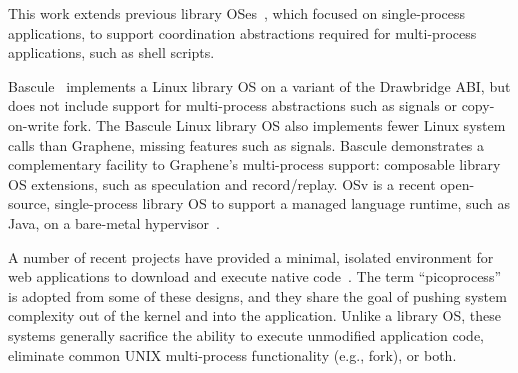 \begin{comment}
Recent library OSes, including Graphene,
search for a better
division of labor between the host kernel and guests.
Paravirtualized VMs attempt to move away from modeling specific hardware designs in software
toward a more virtualization-friendly hardware model~\citep{barham03xen,whitaker02denali, eiraku09outsourcing}.
Library OSes can be viewed as extreme paravirtualization---attempting
to find the most ideal interface between guest and host. %
\end{comment}


This work extends previous library OSes~\citep{porter11drawbridge,xax,unikernels,baumann13bascule,osv},
which focused on single-process applications,
to support coordination abstractions required 
for multi-process applications, such as shell scripts.


Bascule~\citep{baumann13bascule} implements a Linux library OS on a variant of the Drawbridge ABI,
but does not include support for multi-process abstractions such as signals or copy-on-write fork.
The Bascule Linux library OS also implements fewer Linux system calls than Graphene, missing
features such as signals.
Bascule demonstrates a complementary facility to Graphene's multi-process support: composable library OS extensions, 
such as speculation and record/replay.
OSv is a recent open-source, %
single-process 
library OS to support a managed language runtime, such as Java, on a bare-metal hypervisor~\citep{osv}.


A number of recent projects have provided a minimal, isolated environment
for web applications to download and execute native code~\citep{nacl,xax,howell13refactoring,gazelle,atlantis}.
The term ``picoprocess'' is adopted from some of these designs, and they share 
the goal of pushing system complexity out of the kernel and into the application.
Unlike a library OS, these systems
generally sacrifice the ability to execute unmodified application code, 
eliminate common UNIX multi-process functionality (e.g., fork), or both.


